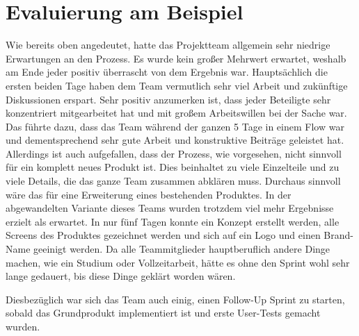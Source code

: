 \section{Evaluierung am Beispiel}
Wie bereits oben angedeutet, hatte das Projektteam allgemein sehr niedrige Erwartungen an den Prozess. Es wurde kein großer Mehrwert erwartet, weshalb am Ende jeder positiv überrascht von dem Ergebnis war. Hauptsächlich die ersten beiden Tage haben dem Team vermutlich sehr viel Arbeit und zukünftige Diskussionen erspart. Sehr positiv anzumerken ist, dass jeder Beteiligte sehr konzentriert mitgearbeitet hat und mit großem Arbeitswillen bei der Sache war. Das führte dazu, dass das Team während der ganzen 5 Tage in einem Flow war und dementsprechend sehr gute Arbeit und konstruktive Beiträge geleistet hat. Allerdings ist auch aufgefallen, dass der Prozess, wie vorgesehen, nicht sinnvoll für ein komplett neues Produkt ist. Dies beinhaltet zu viele Einzelteile und zu viele Details, die das ganze Team zusammen abklären muss. Durchaus sinnvoll wäre das für eine Erweiterung eines bestehenden Produktes. In der abgewandelten Variante dieses Teams wurden trotzdem viel mehr Ergebnisse erzielt als erwartet. In nur fünf Tagen konnte ein Konzept erstellt werden, alle Screens des Produktes gezeichnet werden und sich auf ein Logo und einen Brand-Name geeinigt werden. Da alle Teammitglieder hauptberuflich andere Dinge machen, wie ein Studium oder Vollzeitarbeit, hätte es ohne den Sprint wohl sehr lange gedauert, bis diese Dinge geklärt worden wären.

Diesbezüglich war sich das Team auch einig, einen Follow-Up Sprint zu starten, sobald das Grundprodukt implementiert ist und erste User-Tests gemacht wurden.